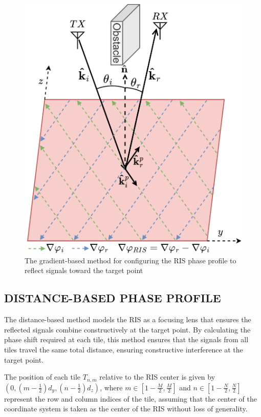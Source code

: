 \documentclass{IEEEoj}
\begin{document}
\begin{figure}
	\centering \includegraphics[width=.7\linewidth]{RIS_Phase_Gradient.png}
	\caption{The gradient-based method for configuring the RIS phase profile to reflect signals toward the target point}
	\label{RIS_Phase_Gradient}
\end{figure}

\subsection{DISTANCE-BASED PHASE PROFILE}
The distance-based method models the RIS as a focusing lens that ensures the reflected signals combine constructively at the target point. By calculating the phase shift required at each tile, this method ensures that the signals from all tiles travel the same total distance, ensuring constructive interference at the target point.

The position of each tile $T_{n,m}$ relative to the RIS center is given by $(0, (m-\frac{1}{2})d_y, (n-\frac{1}{2})d_z)$, where $m \in \left[ 1 - \frac{M}{2}, \frac{M}{2} \right]$ and $n \in \left[ 1 - \frac{N}{2}, \frac{N}{2} \right]$ represent the row and column indices of the tile, assuming that the center of the coordinate system is taken as the center of the RIS without loss of generality.
\end{document}
